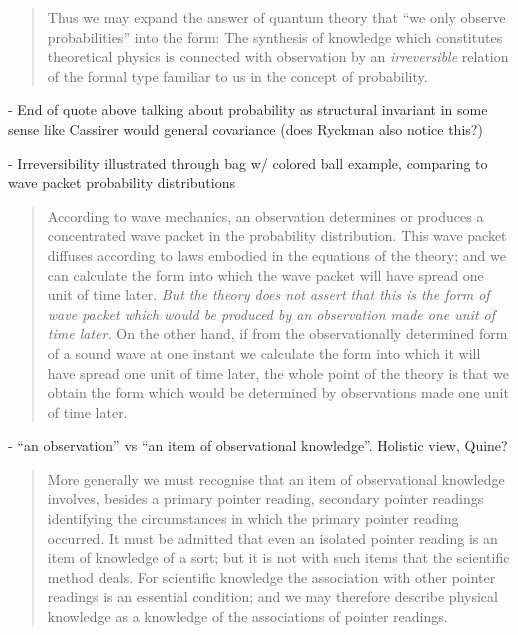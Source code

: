 \documentclass{article}
\begin{document}
\begin{quote}
    Thus we may expand the answer of quantum theory that ``we only observe probabilities'' into the form: The synthesis of knowledge which constitutes theoretical physics is connected with observation by an \emph{irreversible} relation of the formal type familiar to us in the concept of probability.
    \citep[p. 90-91]{Eddington1939}
\end{quote}

- End of quote above talking about probability as structural invariant in some sense like Cassirer would general covariance (does Ryckman also notice this?)

- Irreversibility illustrated through bag w/ colored ball example, comparing to wave packet probability distributions

\begin{quote}
    According to wave mechanics, an observation determines or produces a concentrated wave packet in the probability distribution.  This wave packet diffuses according to laws embodied in the equations of the theory; and we can calculate the form into which the wave packet will have spread one unit of time later.  \emph{But the theory does not assert that this is the form of wave packet which would be produced by an observation made one unit of time later.}  On the other hand, if from the observationally determined form of a sound wave at one instant we calculate the form into which it will have spread one unit of time later, the whole point of the theory is that we obtain the form which would be determined by observations made one unit of time later.  \citep[p. 93]{Eddington1939}
\end{quote}

- ``an observation'' vs ``an item of observational knowledge''.  Holistic view, Quine?

\begin{quote}
    More generally we must recognise that an item of observational knowledge involves, besides a primary pointer reading, secondary pointer readings identifying the circumstances in which the primary pointer reading occurred.  It must be admitted that even an isolated pointer reading is an item of knowledge of a sort; but it is not with such items that the scientific method deals.  For scientific knowledge the association with other pointer readings is an essential condition; and we may therefore describe physical knowledge as a knowledge of the associations of pointer readings.  \citep[p. 100]{Eddington1939}
\end{quote}
\end{document}
